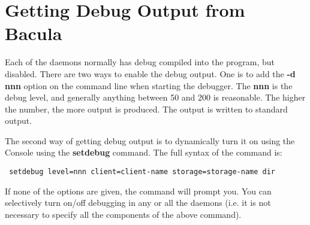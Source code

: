 \section{Getting Debug Output from Bacula}
Each of the daemons normally has debug compiled into the program, but
disabled. There are two ways to enable the debug output. One is to add the
{\bf -d nnn} option on the command line when starting the debugger. The {\bf
nnn} is the debug level, and generally anything between 50 and 200 is
reasonable. The higher the number, the more output is produced. The output is
written to standard output. 

The second way of getting debug output is to dynamically turn it on using the
Console using the {\bf setdebug} command. The full syntax of the command is: 

\footnotesize
\begin{verbatim}
 setdebug level=nnn client=client-name storage=storage-name dir
\end{verbatim}
\normalsize

If none of the options are given, the command will prompt you. You can
selectively turn on/off debugging in any or all the daemons (i.e. it is not
necessary to specify all the components of the above command). 
